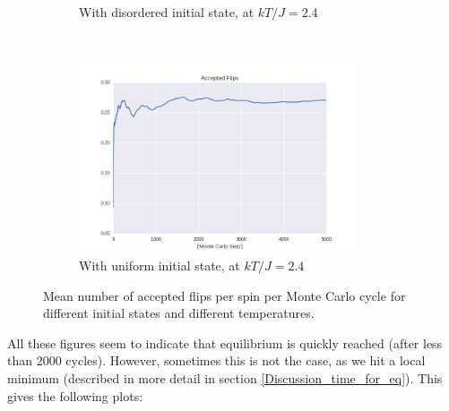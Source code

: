 \documentclass[a4paper, 10pt]{article}
\begin{document}
\begin{figure}[!ht]
\begin{subfigure}[H!]{0.5\textwidth}
        \caption{With disordered initial state, at $kT/J=2.4$}
    \end{subfigure}%
    ~ 
    \begin{subfigure}[H!]{0.5\textwidth}
        \centering
        \includegraphics[height=2.2in]{flipsWUpStartT24.png}
        \caption{With uniform initial state, at $kT/J=2.4$}
    \end{subfigure}
      \caption{Mean number of accepted flips per spin per Monte Carlo cycle for different initial states and different temperatures.}\label{fig:20x20_Sweep_flips}
\end{figure}
All these figures seem to indicate that equilibrium is quickly reached (after less than 2000 cycles). However, sometimes this is not the case, as we hit a local minimum (described in more detail in section \ref{Discussion_time_for_eq}). This gives the following plots:
\end{document}
